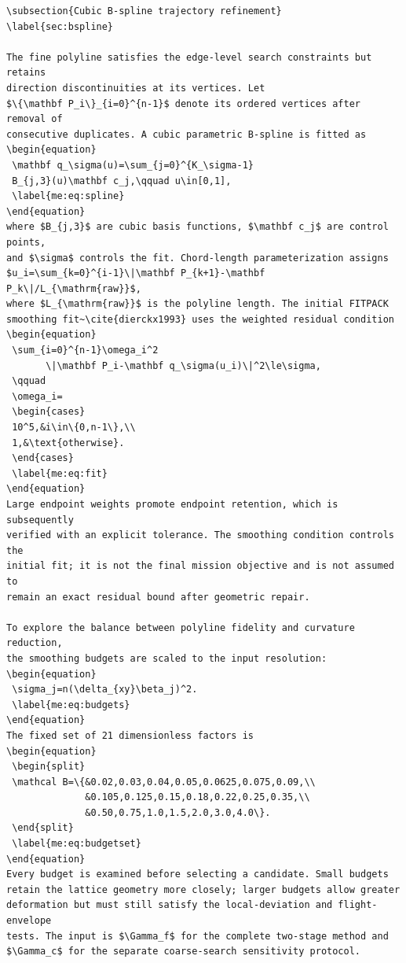 \documentclass[12pt]{article}
\begin{document}
\begin{verbatim}
\subsection{Cubic B-spline trajectory refinement}
\label{sec:bspline}

The fine polyline satisfies the edge-level search constraints but retains
direction discontinuities at its vertices. Let
$\{\mathbf P_i\}_{i=0}^{n-1}$ denote its ordered vertices after removal of
consecutive duplicates. A cubic parametric B-spline is fitted as
\begin{equation}
 \mathbf q_\sigma(u)=\sum_{j=0}^{K_\sigma-1}
 B_{j,3}(u)\mathbf c_j,\qquad u\in[0,1],
 \label{me:eq:spline}
\end{equation}
where $B_{j,3}$ are cubic basis functions, $\mathbf c_j$ are control points,
and $\sigma$ controls the fit. Chord-length parameterization assigns
$u_i=\sum_{k=0}^{i-1}\|\mathbf P_{k+1}-\mathbf P_k\|/L_{\mathrm{raw}}$,
where $L_{\mathrm{raw}}$ is the polyline length. The initial FITPACK
smoothing fit~\cite{dierckx1993} uses the weighted residual condition
\begin{equation}
 \sum_{i=0}^{n-1}\omega_i^2
       \|\mathbf P_i-\mathbf q_\sigma(u_i)\|^2\le\sigma,
 \qquad
 \omega_i=
 \begin{cases}
 10^5,&i\in\{0,n-1\},\\
 1,&\text{otherwise}.
 \end{cases}
 \label{me:eq:fit}
\end{equation}
Large endpoint weights promote endpoint retention, which is subsequently
verified with an explicit tolerance. The smoothing condition controls the
initial fit; it is not the final mission objective and is not assumed to
remain an exact residual bound after geometric repair.

To explore the balance between polyline fidelity and curvature reduction,
the smoothing budgets are scaled to the input resolution:
\begin{equation}
 \sigma_j=n(\delta_{xy}\beta_j)^2.
 \label{me:eq:budgets}
\end{equation}
The fixed set of 21 dimensionless factors is
\begin{equation}
 \begin{split}
 \mathcal B=\{&0.02,0.03,0.04,0.05,0.0625,0.075,0.09,\\
              &0.105,0.125,0.15,0.18,0.22,0.25,0.35,\\
              &0.50,0.75,1.0,1.5,2.0,3.0,4.0\}.
 \end{split}
 \label{me:eq:budgetset}
\end{equation}
Every budget is examined before selecting a candidate. Small budgets
retain the lattice geometry more closely; larger budgets allow greater
deformation but must still satisfy the local-deviation and flight-envelope
tests. The input is $\Gamma_f$ for the complete two-stage method and
$\Gamma_c$ for the separate coarse-search sensitivity protocol.


\end{verbatim}
\end{document}
